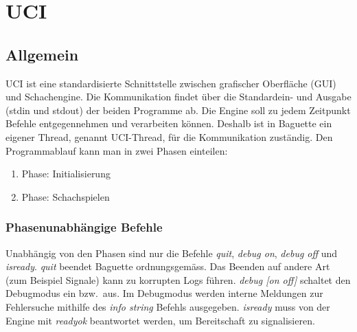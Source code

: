\def \citeuci[#1]{\cite[l. #1]{uci}}
\section{UCI}\label{sec:uci}
\subsection{Allgemein}\label{subsec:allgemein}
UCI ist eine standardisierte Schnittstelle zwischen grafischer Oberfl\"ache (GUI) und Schachengine.
Die Kommunikation findet \"uber die Standardein- und Ausgabe (stdin und stdout) der beiden Programme ab.\citeuci[9]
\newline
Die Engine soll zu jedem Zeitpunkt Befehle entgegennehmen und verarbeiten k\"onnen.\citeuci[15]
Deshalb ist in Baguette ein eigener Thread, genannt UCI-Thread, f\"ur die Kommunikation zust\"andig.
\newline
Den Programmablauf kann man in zwei Phasen einteilen:
\begin{enumerate}
    \item Phase: Initialisierung
    \item Phase: Schachspielen
\end{enumerate}
\subsubsection{Phasenunabh\"angige Befehle}
Unabh\"angig von den Phasen sind nur die Befehle \textit{quit}, \textit{debug on}, \textit{debug off} und \textit{isready}.
\newline\textit{quit} beendet Baguette ordnungsgem\"ass.
Das Beenden auf andere Art (zum Beispiel Signale) kann zu korrupten Logs f\"uhren.
\newline \textit{debug [on off]} schaltet den Debugmodus ein bzw.\  aus.
Im Debugmodus werden interne Meldungen zur Fehlersuche mithilfe des \textit{info string} Befehls ausgegeben.
\newline \textit{isready} muss von der Engine mit \textit{readyok} beantwortet werden, um Bereitschaft zu signalisieren.
